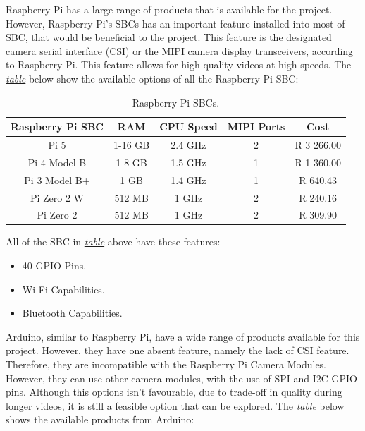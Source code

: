 \noindent Raspberry Pi has a large range of products that is available for the project. However, Raspberry Pi's SBCs has an important feature installed into most of SBC, that would be beneficial to the project. This feature is the designated camera serial interface (CSI) or the MIPI camera display transceivers, according to Raspberry Pi. This feature allows for high-quality videos at high speeds. \citep{RP-DOC} The \textit{\hyperref[tab:Raspberry Pi SBC]{table}} below show the available options of all the Raspberry Pi SBC:

\begin{table}[H]
    \centering
    \caption{Raspberry Pi SBCs.\citep{RP-P}}
    \begin{tabular}{|c|c|c|c|c|}
    \hline
        Raspberry Pi SBC & RAM & CPU Speed & MIPI Ports & Cost \\
    \hline
        Pi 5 & 1-16 GB & 2.4 GHz & 2 & R 3 266.00\\
    \hline
        Pi 4 Model B & 1-8 GB & 1.5 GHz & 1 & R 1 360.00\\
    \hline
        Pi 3 Model B+ & 1 GB & 1.4 GHz & 1 & R 640.43\\
    \hline
        Pi Zero 2 W & 512 MB & 1 GHz & 2 & R 240.16 \\ 
    \hline
        Pi Zero 2 & 512 MB & 1 GHz & 2 & R 309.90 \\ 
    \hline
    \end{tabular}
    \label{tab:Raspberry Pi SBC}
\end{table}

\noindent All of the SBC in \textit{\hyperref[tab:Raspberry Pi SBC]{table}} above have these features:

\begin{itemize}
    \item 40 GPIO Pins.
    \item Wi-Fi Capabilities.
    \item Bluetooth Capabilities.
\end{itemize}

\noindent Arduino, similar to Raspberry Pi, have a wide range of products available for this project. However, they have one absent feature, namely the lack of CSI feature. Therefore, they are incompatible with the Raspberry Pi Camera Modules. However, they can use other camera modules, with the use of SPI and I2C GPIO pins. Although this options isn't favourable, due to trade-off in quality during longer videos, it is still a feasible option that can be explored. \citep{GH-AA} The \textit{\hyperref[tab:Arduino SBCs]{table}} below shows the available products from Arduino:

